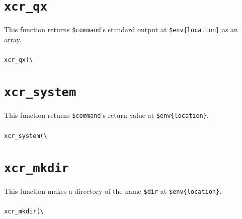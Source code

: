 \documentclass[a4paper,10pt]{report}
\def\|{\verb|} %|
\begin{document}
\section{\texttt{xcr\_qx}}

This function returns \texttt{\$command}'s standard output at
\texttt{\$env\{location\}} as an array.

\subsubsection{\format}

\begin{boxnote}
\begin{alltt}
xcr_qx(\|\|%\textit{env}, $command);
\end{alltt}
\end{boxnote}
\vspace{\baselineskip}

\section{\texttt{xcr\_system}}

This function returns \texttt{\$command}'s return value at
\texttt{\$env\{location\}}.

\subsubsection{\format}

\begin{boxnote}
\begin{alltt}
xcr_system(\|\|%\textit{env}, $command);
\end{alltt}
\end{boxnote}
\vspace{\baselineskip}

\section{\texttt{xcr\_mkdir}}

This function makes a directory of the name \texttt{\$dir} at
\texttt{\$env\{location\}}.

\subsubsection{\format}

\begin{boxnote}
\begin{alltt}
xcr_mkdir(\|\|%\textit{env}, $dir);
\end{alltt}
\end{boxnote}
\vspace{\baselineskip}
\end{document}
